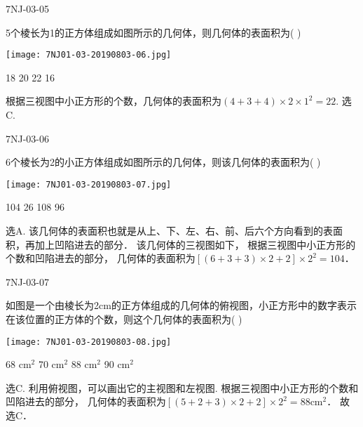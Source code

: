 \begin{defproblem}{7NJ-03-05}%
\begin{onlyproblem}%
5个棱长为1的正方体组成如图所示的几何体，则几何体的表面积为(    ) 
\begin{center}
\texttt{[image: 7NJ01-03-20190803-06.jpg]}
\end{center}

\xx
{18}
{20}
{22}
{16}

\end{onlyproblem}%
\begin{onlysolution}%
\begin{solution}%
根据三视图中小正方形的个数，几何体的表面积为$(4+3+4) \times 2 \times 1^{2}=22$.
选C.
\end{solution}%
\end{onlysolution}%
\end{defproblem}




\begin{defproblem}{7NJ-03-06}%
\begin{onlyproblem}%
6个棱长为2的小正方体组成如图所示的几何体，则该几何体的表面积为(    ) 
\begin{center}
\texttt{[image: 7NJ01-03-20190803-07.jpg]}
\end{center}

\xx
{104}
{26}
{108}
{96}

\end{onlyproblem}%
\begin{onlysolution}%
\begin{solution}%
选A. 
该几何体的表面积也就是从上、下、左、右、前、后六个方向看到的表面积，再加上凹陷进去的部分． 该几何体的三视图如下，   根据三视图中小正方形的个数和凹陷进去的部分， 几何体的表面积为$[(6+3+3) \times 2+2] \times 2^{2}=104$． 
\end{solution}%
\end{onlysolution}%
\end{defproblem}



\begin{defproblem}{7NJ-03-07}%
\begin{onlyproblem}%
如图是一个由棱长为2cm的正方体组成的几何体的俯视图，小正方形中的数字表示在该位置的正方体的个数，则这个几何体的表面积为(    ) 
\begin{center}
\texttt{[image: 7NJ01-03-20190803-08.jpg]}
\end{center}
\xx
{68 cm$^2$}
{70 cm$^2$}
{88 cm$^2$}
{90 cm$^2$}

\end{onlyproblem}%
\begin{onlysolution}%
\begin{solution}%
选C.
利用俯视图，可以画出它的主视图和左视图.   根据三视图中小正方形的个数和凹陷进去的部分， 几何体的表面积为$[(5+2+3) \times 2+2] \times 2^{2}=88 \mathrm{cm}^{2}$． 故选C． 
\end{solution}%
\end{onlysolution}%
\end{defproblem}

